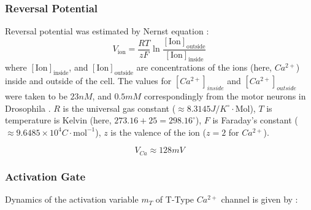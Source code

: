 \documentclass[../../workflow.tex]{subfiles}
\begin{document}
\subsubsection{Reversal Potential}\label{subsbusec_reversal_potential}

Reversal potential was estimated by Nernst equation \cite{izhikevichDynamicalSystemsNeuroscience2006}:
\begin{equation*}
    V_{\text{ion}} = \frac{RT}{zF}\ln{\frac{[\text{Ion}]_{\text{outside}}}{[\text{Ion}]_{\text{inside}}}}
\end{equation*}
where $[\text{Ion}]_{\text{inside}}$, and $[\text{Ion}]_{\text{outside}}$ are concentrations of the ions
(here, $Ca^{2+}$) inside and outside of the cell. The values for $[Ca^{2+}]_{inside}$ and 
$[Ca^{2+}]_{outside}$ were taken to be $23 nM$, and $0.5 mM$ correspondingly
from the motor neurons in Drosophila \cite{macleodFastCalciumSignals2002}.
$R$ is the universal gas constant
($\approx 8.3145 J/K^\circ \cdot \text{Mol}$), $T$ is temperature is Kelvin (here, $273.16+25=298.16^{\circ}$), $F$ is Faraday's constant
($\approx 9.6485 \times 10^{4} C\cdot \text{mol}^{-1}$), $z$ is the valence of the ion ($z=2$ for $Ca^{2+}$).

\begin{equation*}
    V_{Ca} \approx 128 mV
\end{equation*}


\subsubsection{Activation Gate}
Dynamics of the activation variable $m_T$ of T-Type $Ca^{2+}$ channel is given by \cite{wangModelTtypeCalcium1991}:
\end{document}
